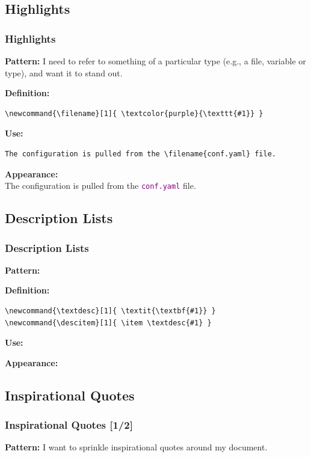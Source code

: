 {\subsection{Highlights}
\begin{frame}[fragile]
  \frametitle{Highlights}
  \vspace{3mm}
  \textbf{Pattern:} I need to refer to something of a particular type (e.g., a file, variable or type), and want it to stand out.
  
  \vspace{5mm}
  \textbf{Definition:}
  \begin{verbatim}
\newcommand{\filename}[1]{ \textcolor{purple}{\texttt{#1}} }
  \end{verbatim}
  
  \vspace{5mm}
  \textbf{Use:}
  \begin{verbatim}
The configuration is pulled from the \filename{conf.yaml} file.
  \end{verbatim}
  
  \vspace{5mm}
  \textbf{Appearance:}
  \\
  The configuration is pulled from the \textcolor{purple}{\texttt{conf.yaml}} file.
\end{frame}

\subsection{Description Lists}
\begin{frame}[fragile]
  \frametitle{Description Lists}
  \vspace{3mm}
  \textbf{Pattern:}
  
  \vspace{5mm}
  \textbf{Definition:}
  \begin{verbatim}
\newcommand{\textdesc}[1]{ \textit{\textbf{#1}} }
\newcommand{\descitem}[1]{ \item \textdesc{#1} }
  \end{verbatim}
  
  \vspace{5mm}
  \textbf{Use:}
  
  \vspace{5mm}
  \textbf{Appearance:}
\end{frame}

\subsection{Inspirational Quotes}
\begin{frame}[fragile]
  \frametitle{Inspirational Quotes [1/2]}
  \vspace{3mm}
  \textbf{Pattern:} I want to sprinkle inspirational quotes around my document.
  

\end{frame}}
